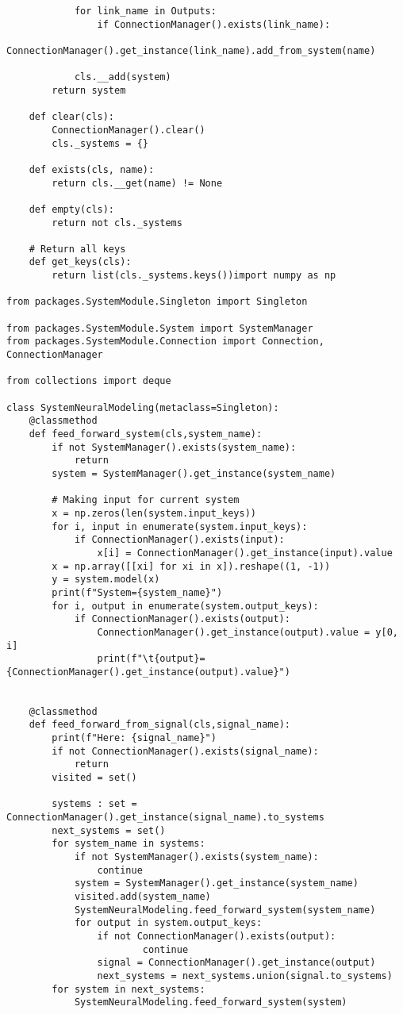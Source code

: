 \begin{lstlisting}
            for link_name in Outputs:
                if ConnectionManager().exists(link_name):
                    ConnectionManager().get_instance(link_name).add_from_system(name)
            
            cls.__add(system)
        return system
    
    def clear(cls):
        ConnectionManager().clear()
        cls._systems = {}
    
    def exists(cls, name):
        return cls.__get(name) != None
    
    def empty(cls):
        return not cls._systems
    
    # Return all keys
    def get_keys(cls):
        return list(cls._systems.keys())import numpy as np

from packages.SystemModule.Singleton import Singleton

from packages.SystemModule.System import SystemManager
from packages.SystemModule.Connection import Connection, ConnectionManager

from collections import deque

class SystemNeuralModeling(metaclass=Singleton):
    @classmethod
    def feed_forward_system(cls,system_name):
        if not SystemManager().exists(system_name):
            return
        system = SystemManager().get_instance(system_name)
            
        # Making input for current system
        x = np.zeros(len(system.input_keys))
        for i, input in enumerate(system.input_keys):
            if ConnectionManager().exists(input):
                x[i] = ConnectionManager().get_instance(input).value
        x = np.array([[xi] for xi in x]).reshape((1, -1))
        y = system.model(x)
        print(f"System={system_name}")
        for i, output in enumerate(system.output_keys):
            if ConnectionManager().exists(output):
                ConnectionManager().get_instance(output).value = y[0, i]
                print(f"\t{output}={ConnectionManager().get_instance(output).value}")
    
    
    @classmethod
    def feed_forward_from_signal(cls,signal_name):
        print(f"Here: {signal_name}")
        if not ConnectionManager().exists(signal_name):
            return
        visited = set()
        
        systems : set = ConnectionManager().get_instance(signal_name).to_systems
        next_systems = set()
        for system_name in systems:
            if not SystemManager().exists(system_name):
                continue
            system = SystemManager().get_instance(system_name)
            visited.add(system_name)
            SystemNeuralModeling.feed_forward_system(system_name)
            for output in system.output_keys:
                if not ConnectionManager().exists(output):
                        continue
                signal = ConnectionManager().get_instance(output)
                next_systems = next_systems.union(signal.to_systems)
        for system in next_systems:
            SystemNeuralModeling.feed_forward_system(system)
    

\end{lstlisting}
